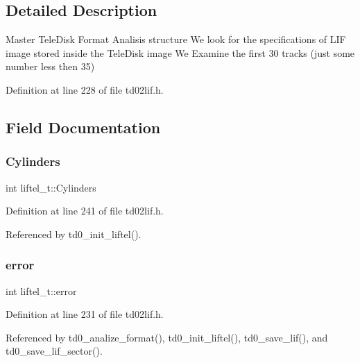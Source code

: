 \subsection{Detailed Description}
Master Tele\+Disk Format Analisis structure We look for the specifications of L\+IF image stored inside the Tele\+Disk image We Examine the first 30 tracks (just some number less then 35) 

Definition at line 228 of file td02lif.\+h.



\subsection{Field Documentation}
\mbox{\label{structliftel__t_aa7893691b509641459d8c1c0a8664aa5}} 
\subsubsection{\texorpdfstring{Cylinders}{Cylinders}}
{\footnotesize\ttfamily int liftel\+\_\+t\+::\+Cylinders}



Definition at line 241 of file td02lif.\+h.



Referenced by td0\+\_\+init\+\_\+liftel().

\mbox{\label{structliftel__t_abc69ee3835be72037c41a11b7457cecd}} 
\subsubsection{\texorpdfstring{error}{error}}
{\footnotesize\ttfamily int liftel\+\_\+t\+::error}



Definition at line 231 of file td02lif.\+h.



Referenced by td0\+\_\+analize\+\_\+format(), td0\+\_\+init\+\_\+liftel(), td0\+\_\+save\+\_\+lif(), and td0\+\_\+save\+\_\+lif\+\_\+sector().

\mbox{\label{structliftel__t_a2269b4ce15afd4b98369c38752d31037}} 
